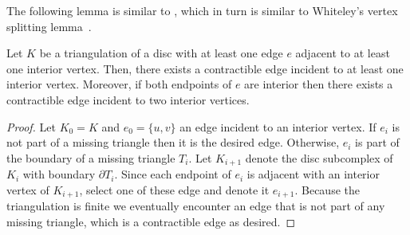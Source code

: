 %
The following lemma is similar to \cite[Lemma 4.10]{keehn24-exterior}, which in turn is similar to Whiteley's vertex splitting lemma~\cite{whiteley90-split}.  
\begin{lemma}
  \label{l:interior-edge}
  Let $K$ be a triangulation of a disc with at least one edge $e$ adjacent to at least one interior vertex. 
  Then, there exists a contractible edge incident to at least one interior vertex.
  Moreover, if both endpoints of $e$ are interior then there exists a contractible edge incident to two interior vertices.
\end{lemma}
\begin{proof}
  Let $K_0 = K$ and $e_0=\{u,v\}$ an edge incident to an interior vertex.
  If $e_i$ is not part of a missing triangle then it is the desired edge.
  Otherwise, $e_i$ is part of the boundary of a missing triangle $T_i$.
  Let $K_{i+1}$ denote the disc subcomplex of $K_i$ with boundary $\partial T_i$.
  Since each endpoint of $e_i$ is adjacent with an interior vertex of $K_{i+1}$, 
  select one of these edge and denote it $e_{i+1}$. Because the triangulation is finite
  we eventually encounter an edge that is not part of any missing triangle, which is a contractible edge as desired.
\end{proof}
%
%
